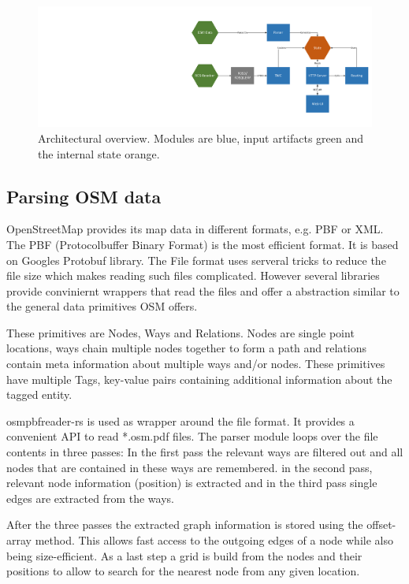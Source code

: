 \documentclass[a4paper]{scrartcl}
\begin{document}
\begin{figure}[t]
\centering
\includegraphics[width=1.0\textwidth]{img/arch_overview.pdf}
\caption{Architectural overview. Modules are blue, input artifacts green and the internal state orange.}
\label{arch}
\end{figure}

\subsection{Parsing OSM data}
\label{sec:parsing}
OpenStreetMap provides its map data in different formats, e.g. PBF or XML. The PBF (Protocolbuffer Binary Format) is the most efficient format. It is based on Googles Protobuf library. The File format uses serveral tricks to reduce the file size which makes reading such files complicated. However several libraries provide conviniernt wrappers that read the files and offer a abstraction similar to the general data primitives OSM offers. 

These primitives are Nodes, Ways and Relations. Nodes are single point locations, ways  chain multiple nodes together to form a path and relations contain meta information about multiple ways and/or nodes. These primitives have multiple Tags, key-value pairs containing additional information about the tagged entity.

osmpbfreader-rs is used as wrapper around the file format. It provides a convenient API to read *.osm.pdf files. The parser module loops over the file contents in three passes:
In the first pass the relevant ways are filtered out and all nodes that are contained in these ways are remembered. in the second pass, relevant node information (position) is extracted and in the third pass single edges are extracted from the ways. 

After the three passes the extracted graph information is stored using the offset-array method. This allows fast access to the outgoing edges of a node while also being size-efficient. As a last step a grid is build from the nodes and their positions to allow to search for the nearest node from any given location.
\end{document}
